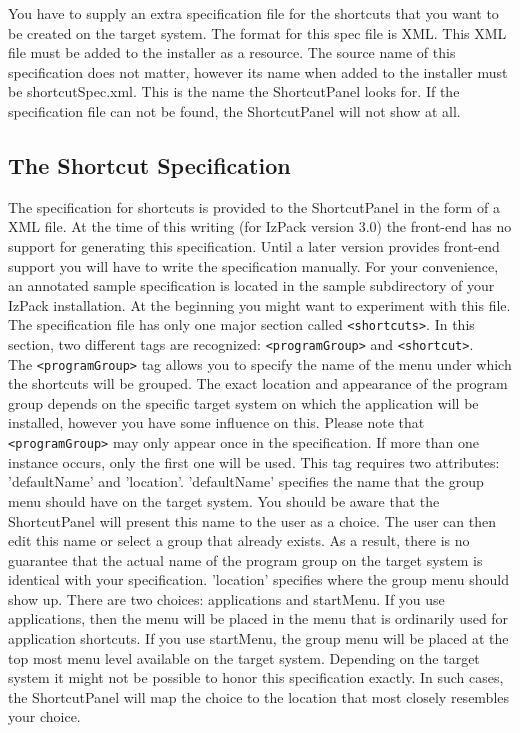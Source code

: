 You have to supply an extra specification file for the shortcuts that
you want to be  created on the target system. The format for this spec
file is XML. This XML file must be added to the installer as a resource.
The source name of this specification does not matter, however its name
when added to the installer must be shortcutSpec.xml. This is the name
the ShortcutPanel looks for. If the specification file can not be found,
the ShortcutPanel will not show at all.\\

\subsection{The Shortcut Specification}

The specification for shortcuts is provided to the ShortcutPanel in the
form of a XML file. At the time of this writing (for IzPack version 3.0)
the front-end has no support for generating this specification. Until a
later version provides front-end support you will have to write the
specification manually. For your convenience, an annotated sample
specification is located in the sample subdirectory of your IzPack
installation. At the beginning you might want to experiment with this
file.\\

The specification file has only one major section called \texttt{<shortcuts>}.
In this section, two different tags are recognized: \texttt{<programGroup>} and
\texttt{<shortcut>}.\\

The \texttt{<programGroup>} tag allows you to specify the name of the menu under
which the shortcuts will be grouped. The exact location and appearance
of the program group depends on the specific target system on which the
application will be installed, however you have some influence on this.
Please note that \texttt{<programGroup>} may only appear once in the
specification. If more than one instance occurs, only the first one will
be used. This tag requires two attributes: 'defaultName' and 'location'.
'defaultName' specifies the name that the group menu should have on the
target system. You should be aware that the ShortcutPanel will present
this name to the user as a choice. The user can then edit this name or
select a group that already exists. As a result, there is no guarantee
that the actual name of the program group on the target system is
identical with your specification. 'location' specifies where the group
menu should show up. There are two choices: applications and startMenu.
If you use applications, then the menu will be placed in the menu that
is ordinarily used for application shortcuts. If you use startMenu, the
group menu will be placed at the top most menu level available on the
target system. Depending on the target system it might not be possible
to honor this specification exactly. In such cases, the ShortcutPanel
will map the choice to the location that most closely resembles your
choice.\\

